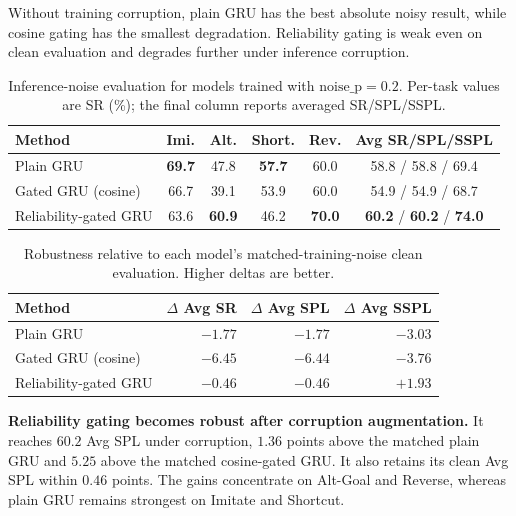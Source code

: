 \documentclass[conference]{IEEEtran}
\begin{document}
Without training corruption, plain GRU has the best absolute noisy result,
while cosine gating has the smallest degradation. Reliability gating is weak
even on clean evaluation and degrades further under inference corruption.

\begin{table}[htbp]
\centering
\caption{Inference-noise evaluation for models trained with
$\mathrm{noise\_p}{=}0.2$. Per-task values are SR (\%); the final column
reports averaged SR/SPL/SSPL.}
\label{tab:noise}
\small
\setlength{\tabcolsep}{3.5pt}
\begin{tabular}{lcccc c}
\toprule
Method & Imi. & Alt. & Short. & Rev. & Avg SR/SPL/SSPL \\
\midrule
Plain GRU             & \textbf{69.7} & 47.8 & \textbf{57.7} & 60.0 & 58.8 / 58.8 / 69.4 \\
Gated GRU (cosine)    & 66.7 & 39.1 & 53.9 & 60.0 & 54.9 / 54.9 / 68.7 \\
Reliability-gated GRU & 63.6 & \textbf{60.9} & 46.2 & \textbf{70.0} & \textbf{60.2} / \textbf{60.2} / \textbf{74.0} \\
\bottomrule
\end{tabular}
\end{table}

\begin{table}[htbp]
\centering
\caption{Robustness relative to each model's matched-training-noise clean evaluation. Higher deltas are better.}
\label{tab:noise_delta}
\small
\setlength{\tabcolsep}{5pt}
\begin{tabular}{lrrr}
\toprule
Method & $\Delta$ Avg SR & $\Delta$ Avg SPL & $\Delta$ Avg SSPL \\
\midrule
Plain GRU             & $-1.77$ & $-1.77$ & $-3.03$ \\
Gated GRU (cosine)    & $-6.45$ & $-6.44$ & $-3.76$ \\
Reliability-gated GRU & $\mathbf{-0.46}$ & $\mathbf{-0.46}$ & $\mathbf{+1.93}$ \\
\bottomrule
\end{tabular}
\end{table}

\textbf{Reliability gating becomes robust after corruption augmentation.} It reaches $60.2$ Avg SPL under corruption, $1.36$ points above the matched plain GRU and $5.25$ above the matched cosine-gated GRU. It also retains its clean Avg SPL within $0.46$ points. The gains concentrate on Alt-Goal and Reverse, whereas plain GRU remains strongest on Imitate and Shortcut.
\end{document}
